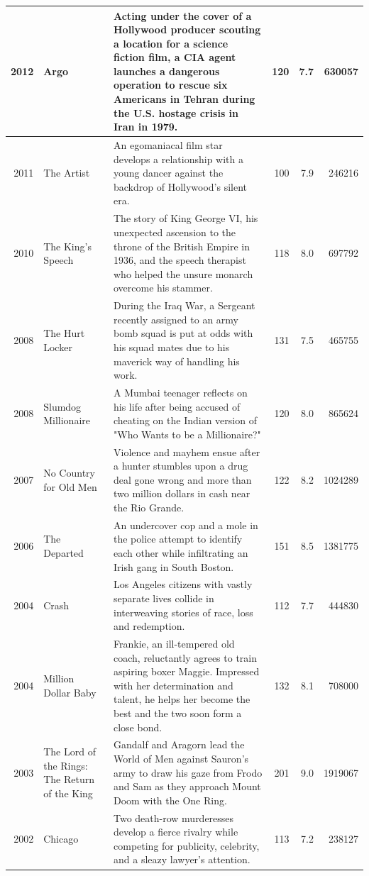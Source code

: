 \documentclass[
]{book}
\begin{document}
\begin{tabular}{r|l|l|r|r|r}
\hline
2012 & Argo & Acting under the cover of a Hollywood producer scouting a location for a science fiction film, a CIA agent launches a dangerous operation to rescue six Americans in Tehran during the U.S. hostage crisis in Iran in 1979. & 120 & 7.7 & 630057\\
\hline
2011 & The Artist & An egomaniacal film star develops a relationship with a young dancer against the backdrop of Hollywood's silent era. & 100 & 7.9 & 246216\\
\hline
2010 & The King's Speech & The story of King George VI, his unexpected ascension to the throne of the British Empire in 1936, and the speech therapist who helped the unsure monarch overcome his stammer. & 118 & 8.0 & 697792\\
\hline
2008 & The Hurt Locker & During the Iraq War, a Sergeant recently assigned to an army bomb squad is put at odds with his squad mates due to his maverick way of handling his work. & 131 & 7.5 & 465755\\
\hline
2008 & Slumdog Millionaire & A Mumbai teenager reflects on his life after being accused of cheating on the Indian version of "Who Wants to be a Millionaire?" & 120 & 8.0 & 865624\\
\hline
2007 & No Country for Old Men & Violence and mayhem ensue after a hunter stumbles upon a drug deal gone wrong and more than two million dollars in cash near the Rio Grande. & 122 & 8.2 & 1024289\\
\hline
2006 & The Departed & An undercover cop and a mole in the police attempt to identify each other while infiltrating an Irish gang in South Boston. & 151 & 8.5 & 1381775\\
\hline
2004 & Crash & Los Angeles citizens with vastly separate lives collide in interweaving stories of race, loss and redemption. & 112 & 7.7 & 444830\\
\hline
2004 & Million Dollar Baby & Frankie, an ill-tempered old coach, reluctantly agrees to train aspiring boxer Maggie. Impressed with her determination and talent, he helps her become the best and the two soon form a close bond. & 132 & 8.1 & 708000\\
\hline
2003 & The Lord of the Rings: The Return of the King & Gandalf and Aragorn lead the World of Men against Sauron's army to draw his gaze from Frodo and Sam as they approach Mount Doom with the One Ring. & 201 & 9.0 & 1919067\\
\hline
2002 & Chicago & Two death-row murderesses develop a fierce rivalry while competing for publicity, celebrity, and a sleazy lawyer's attention. & 113 & 7.2 & 238127\\

\end{tabular}
\end{document}
